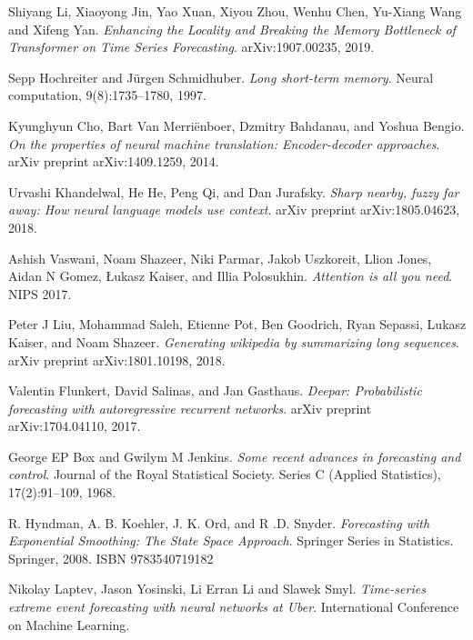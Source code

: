 \documentclass[en]{pracamgr}
\begin{document}
	
	\begin{thebibliography}{99}
		
		 Shiyang Li, Xiaoyong Jin, Yao Xuan, Xiyou Zhou, Wenhu Chen, Yu-Xiang Wang and Xifeng Yan. \textit{Enhancing the Locality and Breaking the Memory
			Bottleneck of Transformer on Time Series Forecasting}. arXiv:1907.00235, 2019.
		
		 Sepp Hochreiter and Jürgen Schmidhuber. \textit{Long short-term memory}. Neural computation, 9(8):1735–1780, 1997.
		
		 Kyunghyun Cho, Bart Van Merriënboer, Dzmitry Bahdanau, and Yoshua Bengio. \textit{On the properties of neural machine translation: Encoder-decoder approaches}. arXiv preprint arXiv:1409.1259, 2014.
		
		 Urvashi Khandelwal, He He, Peng Qi, and Dan Jurafsky. \textit{Sharp nearby, fuzzy far away: How neural language models use context}. arXiv preprint arXiv:1805.04623, 2018.
		
		 Ashish Vaswani, Noam Shazeer, Niki Parmar, Jakob Uszkoreit, Llion Jones, Aidan N Gomez, Łukasz
		Kaiser, and Illia Polosukhin. \textit{Attention is all you need}. NIPS 2017.
		
		 Peter J Liu, Mohammad Saleh, Etienne Pot, Ben Goodrich, Ryan Sepassi, Lukasz Kaiser, and Noam
		Shazeer. \textit{Generating wikipedia by summarizing long sequences}. arXiv preprint arXiv:1801.10198, 2018.
		
		 Valentin Flunkert, David Salinas, and Jan Gasthaus. \textit{Deepar: Probabilistic forecasting with autoregressive recurrent networks}. arXiv preprint arXiv:1704.04110, 2017.
		
		 George EP Box and Gwilym M Jenkins. \textit{Some recent advances in forecasting and control}. Journal of the
		Royal Statistical Society. Series C (Applied Statistics), 17(2):91–109, 1968.
		
		 R. Hyndman, A. B. Koehler, J. K. Ord, and R .D. Snyder. \textit{Forecasting with Exponential Smoothing: The State Space Approach}. Springer Series in Statistics. Springer, 2008. ISBN
		9783540719182
		
		 Nikolay Laptev, Jason Yosinski, Li Erran Li and Slawek Smyl. \textit{Time-series extreme event forecasting with neural networks at Uber}. International Conference on Machine Learning.
		

\end{thebibliography}
\end{document}
